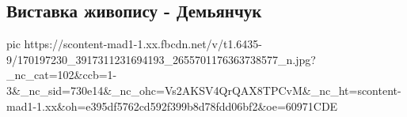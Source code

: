  
 
 
 
 

\subsection{Виставка живопису - Демьянчук}

\ifcmt
  pic https://scontent-mad1-1.xx.fbcdn.net/v/t1.6435-9/170197230_3917311231694193_2655701176363738577_n.jpg?_nc_cat=102&ccb=1-3&_nc_sid=730e14&_nc_ohc=Vs2AKSV4QrQAX8TPCvM&_nc_ht=scontent-mad1-1.xx&oh=e395df5762cd592f399b8d78fdd06bf2&oe=60971CDE
\fi

